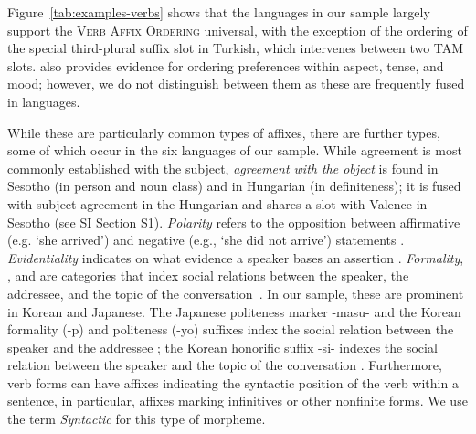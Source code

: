 \documentclass[11pt,letterpaper]{article}
\newcommand{\citep}{\parencite}
\newcommand{\citet}{\Textcite}
\newcounter{def}
\begin{document}

Figure~\ref{tab:examples-verbs} shows that the languages in our sample largely support the \textsc{Verb Affix Ordering} universal, with the exception of the ordering of the special third-plural suffix slot in Turkish, which intervenes between two TAM slots.
\citet{bybee-morphology-1985} also provides evidence for ordering preferences within aspect, tense, and mood; however, we do not distinguish between them as these are frequently fused in languages.


While these are particularly common types of affixes, there are further types, some of which occur in the six languages of our sample.
While agreement is most commonly established with the subject, \textit{agreement with the object} is found in Sesotho \citep{doke1967textbook} (in person and noun class) and in Hungarian \citep{rounds2001hungarian} (in definiteness); it is fused with subject agreement in the Hungarian and shares a slot with Valence in Sesotho (see SI Section S1).
\textit{Polarity} refers to the opposition between affirmative (e.g. `she arrived') and negative  (e.g., `she did not arrive') statements \citep{wals-112}.
\textit{Evidentiality} indicates on what evidence a speaker bases an assertion \citep{aikhenvald2003evidentiality}.
\textit{Formality}, , and  are categories that index social relations between the speaker, the addressee, and the topic of the conversation~\citep{hasegawa2014japanese, yeon2010korean}.
In our sample, these are prominent in Korean and Japanese.
The Japanese politeness marker -masu- and the Korean formality (-p) and politeness (-yo) suffixes index the social relation between the speaker and the addressee \citep{hasegawa2014japanese, yeon2010korean}; the Korean honorific suffix -si- indexes the social relation between the speaker and the topic of the conversation \citep{yeon2010korean}.
Furthermore, verb forms can have affixes indicating the syntactic position of the verb within a sentence, in particular, affixes marking infinitives or other nonfinite forms.
We use the term \textit{Syntactic} for this type of morpheme.
\end{document}
